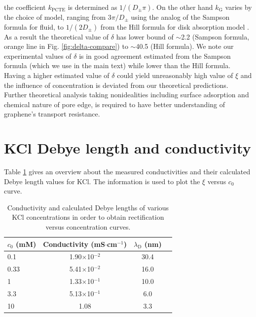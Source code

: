 \documentclass[manuscript=suppinfo,email=true, hyperref=true, keywords=false]{achemso}
\newcommand{\Fig}{Fig.}
\begin{document}
the coefficient $k_{\mathrm{PCTE}}$ is determined as
$1/(D_{\mathrm{\pm}} \pi)$. On the other hand $k_{\mathrm{G}}$ varies
by the choice of model, ranging from $3 \pi / D_{\mathrm{\pm}}$ using
the analog of the Sampson formula for
fluid\cite{Roscoe_1949,Celebi_2014}, to $1/(2 D_{\mathrm{\pm}})$ from
the Hill formula for disk absorption model
\cite{Hill_1975,Grebenkov_2018}. As a result the theoretical value of
$\delta$ has lower bound of $\sim$2.2 (Sampson formula, orange line in
\Fig{} \ref{fig:delta-compare}) to $\sim$40.5 (Hill formula). We note
our experimental values of $\delta$ is in good agreement estimated
from the Sampson formula (which we use in the main text) while lower
than the Hill formula. Having a higher estimated value of $\delta$
could yield unreasonably high value of $\xi$ and the influence of
concentration is deviated from our theoretical predictions. Further
theoretical analysis taking nonidealities including surface adsorption
and chemical nature of pore edge, is required to have better
understanding of graphene's transport resistance.





\section{KCl Debye length and conductivity}
\label{sec:debye}
Table \ref{tab:debye} gives an overview about the measured
conductivities and their calculated Debye length values for KCl. The
information is used to plot the $\xi$ versus $c_{0}$ curve.

\begin{table}[htbp]
  \centering
  \begin{tabular}{lccc}
    \hline
    $c_{0}$ (mM) & Conductivity (mS$\cdot$cm$^{-1}$) & $\lambda_{\mathrm{D}}$ (nm)\\
    \hline
    0.1&        1.90$\times$10$^{-2}$ &        30.4\\
    0.33&       5.41$\times$10$^{-2}$ & 16.0\\
    1   &1.33$\times$10$^{-1}$ & 10.0\\
    3.3&     5.13$\times$10$^{-1}$ &  6.0\\
    10&      1.08    &3.3\\
    \hline
  \end{tabular}
  \caption{Conductivity and calculated Debye lengths of various KCl
    concentrations in order to obtain rectification versus
    concentration curves. }
  \label{tab:debye}
\end{table}
\end{document}
